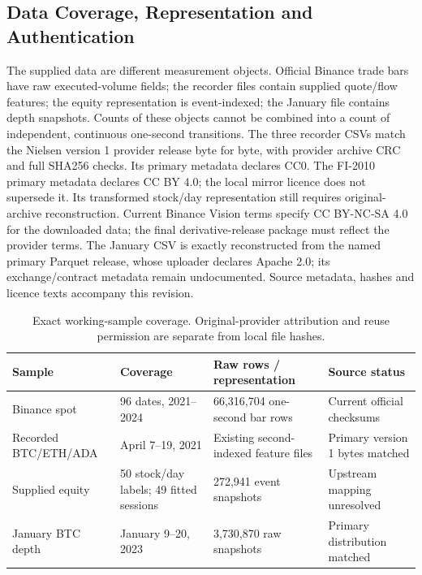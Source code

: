 \documentclass[12pt]{article}
\theoremstyle{definition}
\theoremstyle{remark}
\begin{document}
\subsection{Data Coverage, Representation and Authentication}
The supplied data are different measurement objects. Official Binance trade bars have raw executed-volume fields; the recorder files contain supplied quote/flow features; the equity representation is event-indexed; the January file contains depth snapshots. Counts of these objects cannot be combined into a count of independent, continuous one-second transitions. The three recorder CSVs match the Nielsen version 1 provider release byte for byte, with provider archive CRC and full SHA256 checks. Its primary metadata declares CC0. The FI-2010 primary metadata declares CC BY 4.0; the local mirror licence does not supersede it. Its transformed stock/day representation still requires original-archive reconstruction. Current Binance Vision terms specify CC BY-NC-SA 4.0 for the downloaded data; the final derivative-release package must reflect the provider terms. The January CSV is exactly reconstructed from the named primary Parquet release, whose uploader declares Apache 2.0; its exchange/contract metadata remain undocumented. Source metadata, hashes and licence texts accompany this revision. 
\begin{table}[htbp]
\centering\footnotesize\setlength{\tabcolsep}{3pt}
\caption{Exact working-sample coverage. Original-provider attribution and reuse permission are separate from local file hashes.}
\label{tab:datasets}
\begin{tabularx}{\textwidth}{lXXX}\toprule
Sample & Coverage & Raw rows / representation & Source status \\\midrule
Binance spot & 96 dates, 2021--2024 & 66,316,704 one-second bar rows & Current official checksums \\
Recorded BTC/ETH/ADA & April 7--19, 2021 & Existing second-indexed feature files & Primary version 1 bytes matched \\
Supplied equity & 50 stock/day labels; 49 fitted sessions & 272,941 event snapshots & Upstream mapping unresolved \\
January BTC depth & January 9--20, 2023 & 3,730,870 raw snapshots & Primary distribution matched \\
\bottomrule\end{tabularx}
\end{table}
\end{document}
